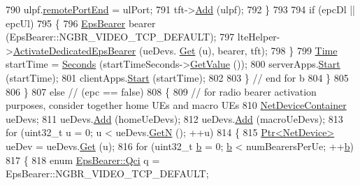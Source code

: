 \begin{DoxyCode}
790                   ulpf.\hyperlink{structns3_1_1EpcTft_1_1PacketFilter_a4bcdd15a9526e27eabd474276f691cf1}{remotePortEnd} = ulPort;
791                   tft->\hyperlink{classns3_1_1EpcTft_a1228456a8abbe48cbc89bbe2d2e9af48}{Add} (ulpf);
792                 \}
793 
794               \textcolor{keywordflow}{if} (epcDl || epcUl)
795                 \{
796                   \hyperlink{structns3_1_1EpsBearer}{EpsBearer} bearer (EpsBearer::NGBR\_VIDEO\_TCP\_DEFAULT);
797                   lteHelper->\hyperlink{classns3_1_1LteHelper_af28041edd4c96bde1a2e07c90e363dcc}{ActivateDedicatedEpsBearer} (ueDevs.
      \hyperlink{classns3_1_1NetDeviceContainer_a677d62594b5c9d2dea155cc5045f4d0b}{Get} (u), bearer, tft);
798                 \}
799               \hyperlink{classns3_1_1Time}{Time} startTime = \hyperlink{group__timecivil_ga33c34b816f8ff6628e33d5c8e9713b9e}{Seconds} (startTimeSeconds->\hyperlink{classns3_1_1UniformRandomVariable_a03822d8c86ac51e9aa83bbc73041386b}{GetValue} ());
800               serverApps.\hyperlink{classns3_1_1ApplicationContainer_a8eff87926507020bbe3e1390358a54a7}{Start} (startTime);
801               clientApps.\hyperlink{classns3_1_1ApplicationContainer_a8eff87926507020bbe3e1390358a54a7}{Start} (startTime);
802 
803             \} \textcolor{comment}{// end for b}
804         \}
805 
806     \} 
807   \textcolor{keywordflow}{else} \textcolor{comment}{// (epc == false)}
808     \{
809       \textcolor{comment}{// for radio bearer activation purposes, consider together home UEs and macro UEs}
810       \hyperlink{classns3_1_1NetDeviceContainer}{NetDeviceContainer} ueDevs;
811       ueDevs.\hyperlink{classns3_1_1NetDeviceContainer_a7ca8bc1d7ec00fd4fcc63869987fbda5}{Add} (homeUeDevs);
812       ueDevs.\hyperlink{classns3_1_1NetDeviceContainer_a7ca8bc1d7ec00fd4fcc63869987fbda5}{Add} (macroUeDevs);
813       \textcolor{keywordflow}{for} (uint32\_t u = 0; u < ueDevs.\hyperlink{classns3_1_1NetDeviceContainer_a74cafc212479bc38976bebd118e856b9}{GetN} (); ++u)
814         \{
815           \hyperlink{classns3_1_1Ptr}{Ptr<NetDevice>} ueDev = ueDevs.\hyperlink{classns3_1_1NetDeviceContainer_a677d62594b5c9d2dea155cc5045f4d0b}{Get} (u);
816           \textcolor{keywordflow}{for} (uint32\_t \hyperlink{buildings__pathloss_8m_a21ad0bd836b90d08f4cf640b4c298e7c}{b} = 0; \hyperlink{buildings__pathloss_8m_a21ad0bd836b90d08f4cf640b4c298e7c}{b} < numBearersPerUe; ++\hyperlink{buildings__pathloss_8m_a21ad0bd836b90d08f4cf640b4c298e7c}{b})
817             \{
818               \textcolor{keyword}{enum} \hyperlink{structns3_1_1EpsBearer_aecf0c67109c5eb4ec0b07226fff5885e}{EpsBearer::Qci} q = EpsBearer::NGBR\_VIDEO\_TCP\_DEFAULT;

\end{DoxyCode}
